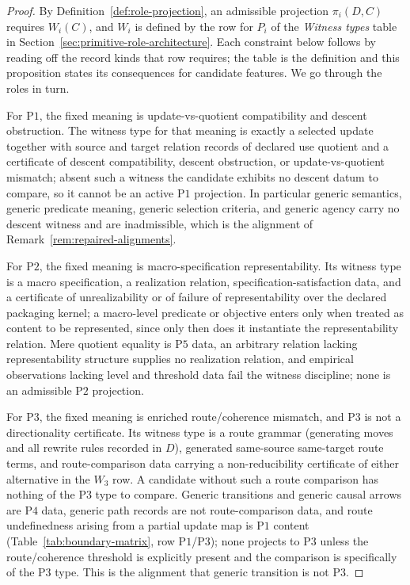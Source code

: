 \documentclass[11pt]{article}
\theoremstyle{definition}
\newcommand{\Pone}{\ensuremath{\mathrm{P1}}}
\newcommand{\Ptwo}{\ensuremath{\mathrm{P2}}}
\newcommand{\Pthree}{\ensuremath{\mathrm{P3}}}
\newcommand{\Pfour}{\ensuremath{\mathrm{P4}}}
\newcommand{\Pfive}{\ensuremath{\mathrm{P5}}}
\begin{document}
\begin{proof}
By Definition~\ref{def:role-projection}, an admissible projection
\(\pi_i(D,C)\) requires \(W_i(C)\), and \(W_i\) is defined by the row for
\(P_i\) of the \emph{Witness types} table in
Section~\ref{sec:primitive-role-architecture}. Each constraint below follows
by reading off the record kinds that row requires; the table is the
definition and this proposition states its consequences for candidate
features. We go through the roles in turn.

For \Pone{}, the fixed meaning is update-vs-quotient compatibility and
descent obstruction. The witness type for that meaning is exactly a
selected update together with source and target relation records of declared use quotient and a
certificate of descent compatibility, descent obstruction, or
update-vs-quotient mismatch; absent such a witness the candidate
exhibits no descent datum to compare, so it cannot be an active \Pone{}
projection. In particular generic semantics, generic predicate meaning,
generic selection criteria, and generic agency carry no descent witness
and are inadmissible, which is the alignment of
Remark~\ref{rem:repaired-alignments}.

For \Ptwo{}, the fixed meaning is macro-specification representability.
Its witness type is a macro specification, a realization relation,
specification-satisfaction data, and a certificate of unrealizability or of
failure of representability over the declared packaging kernel; a macro-level predicate or objective
enters only when treated as content to be represented, since only then
does it instantiate the representability relation. Mere quotient
equality is \Pfive{} data, an arbitrary relation lacking
representability structure supplies no realization relation, and
empirical observations lacking level and threshold data fail the witness
discipline; none is an admissible \Ptwo{} projection.

For \Pthree{}, the fixed meaning is enriched route/coherence mismatch,
and \Pthree{} is not a directionality certificate. Its witness type is
a route grammar (generating moves and all rewrite rules recorded in \(D\)), generated same-source same-target route terms,
and route-comparison data carrying a non-reducibility certificate of either
alternative in the \(W_3\) row. A candidate without such a route
comparison has nothing of the \Pthree{} type to compare. Generic
transitions and generic causal arrows are \Pfour{} data, generic path
records are not route-comparison data, and route undefinedness arising
from a partial update map is \Pone{} content (Table~\ref{tab:boundary-matrix},
row \Pone{}/\Pthree{}); none projects to
\Pthree{} unless the route/coherence threshold is explicitly present and
the comparison is specifically of the \Pthree{} type. This is the
alignment that generic transition is not \Pthree{}.


\end{proof}
\end{document}
